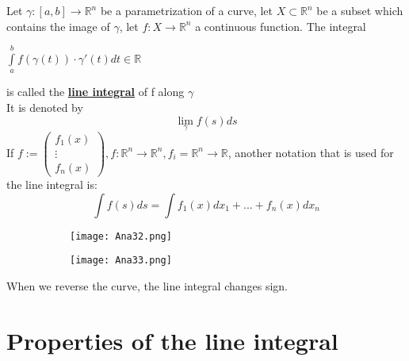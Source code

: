 \documentclass[8pt]{extreport}
\newcommand{\R}{\mathbb{R}}
\begin{document}
Let $\gamma:[a,b] \to \R^n$ be a parametrization of a curve, let $X \subset \R^n$ be a subset which contains the image of $\gamma$, let $f:X\to \R^n$ a continuous function. The integral
\begin{center}
$\int\limits_a^bf(\gamma(t)) \cdot \gamma '(t)dt \in \R$
\end{center}
is called the \textbf{\underline{line integral}} of f along $\gamma$\\
It is denoted by
$$\lim\limits_\gamma f(s)ds$$
If $f:=\begin{pmatrix} f_1(x) \\ \vdots \\ f_n(x)\end{pmatrix}, f: \R^n \to \R^n, f_i = \R^n \to \R$, another notation that is used for the line integral is:
$$ \int f(s)ds = \int  f_1(x)dx_1 + ... + f_n(x)dx_n$$
\begin{figure}[H]
\centering
\begin{subfigure}[b]{0.4\linewidth}
\texttt{[image: Ana32.png]}
\end{subfigure}
\begin{subfigure}[b]{0.4\linewidth}
\texttt{[image: Ana33.png]}
\end{subfigure}
\end{figure}
When we reverse the curve, the line integral changes sign.

\section{Properties of the line integral}
\end{document}
